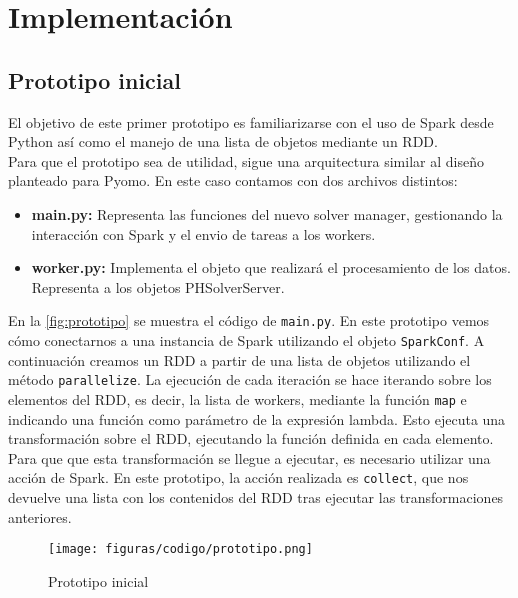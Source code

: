 \chapter{Implementación}
\label{ch:implementacion}

\section{Prototipo inicial}


El objetivo de este primer prototipo es familiarizarse con el uso de Spark desde Python así como el manejo de una lista de objetos mediante un RDD.\\

Para que el prototipo sea de utilidad, sigue una arquitectura similar al diseño planteado para Pyomo. En este caso contamos con dos archivos distintos:

\begin{itemize}
    \item \textbf{main.py: } Representa las funciones del nuevo solver manager, gestionando la interacción con Spark y el envio de tareas a los workers.
    \item \textbf{worker.py: } Implementa el objeto que realizará el procesamiento de los datos. Representa a los objetos PHSolverServer.
\end{itemize}

En la \autoref{fig:prototipo} se muestra el código de \texttt{main.py}. En este prototipo vemos cómo conectarnos a una instancia de Spark utilizando el objeto \texttt{SparkConf}. A continuación creamos un RDD a partir de una lista de objetos utilizando el método \texttt{parallelize}.
La ejecución de cada iteración se hace iterando sobre los elementos del RDD, es decir, la lista de workers, mediante la función \texttt{map} e indicando una función como parámetro de la expresión lambda. Esto ejecuta una transformación sobre el RDD, ejecutando la función definida en cada elemento. 
Para que que esta transformación se llegue a ejecutar, es necesario utilizar una acción de Spark. En este prototipo, la acción realizada es \texttt{collect}, que nos devuelve una lista con los contenidos del RDD tras ejecutar las transformaciones anteriores.\\

\begin{figure}[]
    \centerline{\texttt{[image: figuras/codigo/prototipo.png]}}
    \caption{Prototipo inicial}
    \label{fig:prototipo}
\end{figure}

